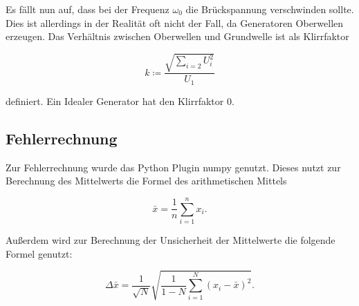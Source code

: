 Es fällt nun auf, dass bei der Frequenz $\omega_0$ die Brückspannung verschwinden sollte.
Dies ist allerdings in der Realität oft nicht der Fall, da Generatoren Oberwellen erzeugen.
Das Verhältnis zwischen Oberwellen und Grundwelle ist als Klirrfaktor

\begin{equation*}
    k \coloneq \frac{\sqrt{\sum_{i=2} U_i^2}}{U_1}
\end{equation*}

definiert. Ein Idealer Generator hat den Klirrfaktor 0.

\subsection{Fehlerrechnung}

Zur Fehlerrechnung wurde das Python Plugin numpy \cite{numpy} genutzt.
Dieses nutzt zur Berechnung des Mittelwerts die Formel des arithmetischen Mittels

\begin{equation}
    \bar{x} = \frac{1}{n} \sum_{i=1}^n x_i.
    \label{eqn:mittel}
\end{equation}

Außerdem wird zur Berechnung der Unsicherheit der Mittelwerte die folgende Formel genutzt:

\begin{equation}
    \Delta \bar{x} = \frac{1}{\sqrt{N}} \sqrt{\frac{1}{1-N} \sum_{i=1}^N (x_i-\bar{x})^2}.
    \label{eqn:fehler}
\end{equation}

